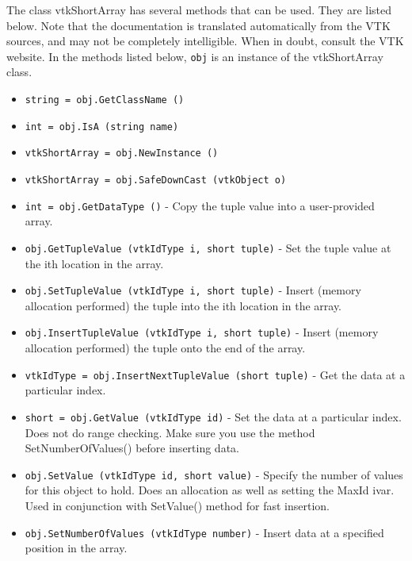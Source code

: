 The class vtkShortArray has several methods that can be used.
  They are listed below.
Note that the documentation is translated automatically from the VTK sources,
and may not be completely intelligible.  When in doubt, consult the VTK website.
In the methods listed below, \verb|obj| is an instance of the vtkShortArray class.
\begin{itemize}
\item  \verb|string = obj.GetClassName ()|

\item  \verb|int = obj.IsA (string name)|

\item  \verb|vtkShortArray = obj.NewInstance ()|

\item  \verb|vtkShortArray = obj.SafeDownCast (vtkObject o)|

\item  \verb|int = obj.GetDataType ()| -  Copy the tuple value into a user-provided array.

\item  \verb|obj.GetTupleValue (vtkIdType i, short tuple)| -  Set the tuple value at the ith location in the array.

\item  \verb|obj.SetTupleValue (vtkIdType i, short tuple)| -  Insert (memory allocation performed) the tuple into the ith location
 in the array.

\item  \verb|obj.InsertTupleValue (vtkIdType i, short tuple)| -  Insert (memory allocation performed) the tuple onto the end of the array.

\item  \verb|vtkIdType = obj.InsertNextTupleValue (short tuple)| -  Get the data at a particular index.

\item  \verb|short = obj.GetValue (vtkIdType id)| -  Set the data at a particular index. Does not do range checking. Make sure
 you use the method SetNumberOfValues() before inserting data.

\item  \verb|obj.SetValue (vtkIdType id, short value)| -  Specify the number of values for this object to hold. Does an
 allocation as well as setting the MaxId ivar. Used in conjunction with
 SetValue() method for fast insertion.

\item  \verb|obj.SetNumberOfValues (vtkIdType number)| -  Insert data at a specified position in the array.


\end{itemize}
